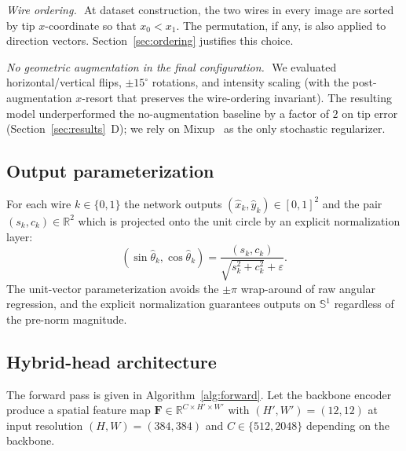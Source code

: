 \documentclass[conference,10pt,letterpaper]{IEEEtran}
\begin{document}
\emph{Wire ordering.}\,\,
At dataset construction, the two wires in every image are sorted by tip
$x$-coordinate so that $x_0 < x_1$. The permutation, if any, is also
applied to direction vectors. Section~\ref{sec:ordering} justifies this
choice.

\emph{No geometric augmentation in the final configuration.}\,\,
We evaluated horizontal/vertical flips, $\pm15^\circ$ rotations, and
intensity scaling (with the post-augmentation $x$-resort that preserves
the wire-ordering invariant). The resulting model underperformed the
no-augmentation baseline by a factor of $2$ on tip error
(Section~\ref{sec:results}~D); we rely on
Mixup~\cite{zhang2018mixup} as the only stochastic regularizer.

\subsection{Output parameterization}
For each wire $k\in\{0,1\}$ the network outputs
$(\hat{x}_k,\hat{y}_k)\in[0,1]^2$ and the pair $(s_k,c_k)\in\mathbb{R}^2$
which is projected onto the unit circle by an explicit normalization
layer:
\begin{equation}
  (\sin\hat\theta_k,\cos\hat\theta_k) = \frac{(s_k,c_k)}{\sqrt{s_k^2+c_k^2}+\varepsilon}.
\end{equation}
The unit-vector parameterization avoids the $\pm\pi$ wrap-around of raw
angular regression, and the explicit normalization guarantees outputs on
$\mathbb{S}^1$ regardless of the pre-norm magnitude.

\subsection{Hybrid-head architecture}
\label{sec:hybrid}
The forward pass is given in Algorithm~\ref{alg:forward}. Let the
backbone encoder produce a spatial feature map
$\mathbf{F}\in\mathbb{R}^{C\times H'\times W'}$ with $(H',W')=(12,12)$ at
input resolution $(H,W)=(384,384)$ and $C\in\{512,2048\}$ depending on
the backbone.
\end{document}
